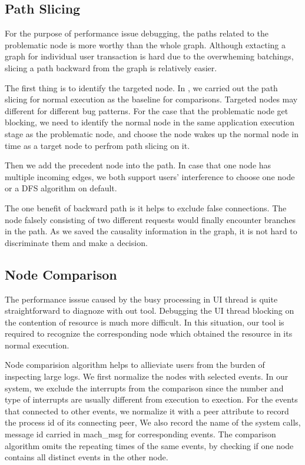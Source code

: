 \subsection{Path Slicing}
For the purpose of performance issue debugging, the paths related to the problematic node
is more worthy than the whole graph.
Although extacting a graph for individual user transaction is hard due to the overwheming batchings,
slicing a path backward from the graph is relatively easier.

The first thing is to identify the targeted node.
In \xxx, we carried out the path slicing for normal execution as the baseline for comparisons.
Targeted nodes may different for different bug patterns.
For the case that the problematic node get blocking, 
we need to identify the normal node in the same application execution stage as the problematic node,
and choose the node wakes up the normal node in time as a target node to perfrom path slicing on it.

Then we add the precedent node into the path. 
In case that one node has multiple incoming edges,
we both support users' interference to choose one node or a DFS algorithm on default.

The one benefit of backward path is it helps to exclude false connections.
The node falsely consisting of two different requests would finally encounter branches in the path.
As we saved the causality information in the graph, it is not hard to discriminate them and make a decision.
                                                                                                                         
\subsection{Node Comparison}
The performance isssue caused by the busy processing in UI thread is quite straightforward to diagnoze with out tool.
Debugging the UI thread blocking on the contention of resource is much more difficult.
In this situation, our tool is required to recognize the corresponding node
which obtained the resource in its normal execution.

Node comparision algorithm helps to allieviate users from the burden of inspecting large logs.
We first normalize the nodes with selected events.
In our system, we exclude the interrupts from the comparison
since the number and type of interrupts are usually different from execution to exection.
For the events that connected to other events, we normalize it with a peer attribute
to record the process id of its connecting peer,
We also record the name of the system calls, message id carried in mach\_msg for corresponding events.
The comparison algorithm omits the repeating times of the same events,
by checking if one node contains all distinct events in the other node.

